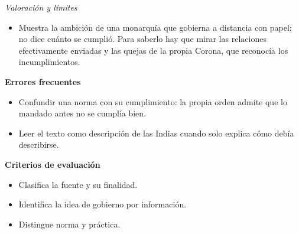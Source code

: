 \documentclass{book}
\begin{document}
\begin{tcolorbox}[title={Ejercicio resuelto}, studiumworked, breakable]
\noindent\textit{Valoración y límites}
\begin{itemize}
\item Muestra la ambición de una monarquía que gobierna a distancia con papel; no dice cuánto se cumplió. Para saberlo hay que mirar las relaciones efectivamente enviadas y las quejas de la propia Corona, que reconocía los incumplimientos.
\end{itemize}

\noindent\textbf{Errores frecuentes}
\begin{itemize}
\item Confundir una norma con su cumplimiento: la propia orden admite que lo mandado antes no se cumplía bien.
\item Leer el texto como descripción de las Indias cuando solo explica cómo debía describirse.
\end{itemize}

\noindent\textbf{Criterios de evaluación}
\begin{itemize}
\item Clasifica la fuente y su finalidad.
\item Identifica la idea de gobierno por información.
\item Distingue norma y práctica.
\end{itemize}
\end{tcolorbox}
\end{document}
